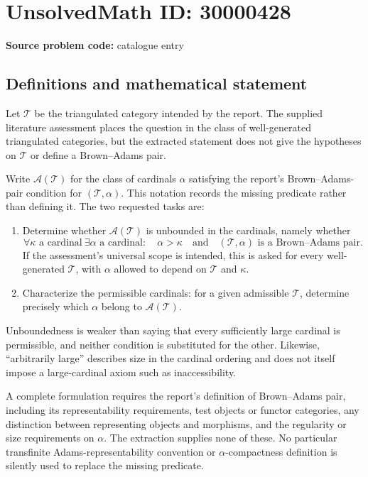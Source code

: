 \documentclass[11pt]{article}
\begin{document}
\section*{UnsolvedMath ID: 30000428}
\textbf{Source problem code:} catalogue entry
\subsection{Definitions and mathematical statement}
Let $\mathcal T$ be the triangulated category intended by the report. The supplied literature assessment places the question in the class of well-generated triangulated categories, but the extracted statement does not give the hypotheses on $\mathcal T$ or define a Brown--Adams pair.

Write $\mathcal A(\mathcal T)$ for the class of cardinals $\alpha$ satisfying the report's Brown--Adams-pair condition for $(\mathcal T,\alpha)$. This notation records the missing predicate rather than defining it. The two requested tasks are:
\begin{enumerate}
\item Determine whether $\mathcal A(\mathcal T)$ is unbounded in the cardinals, namely whether
\[
 \forall\kappa\text{ a cardinal}\ \exists\alpha\text{ a cardinal}:
 \quad\alpha>\kappa\quad\text{and}\quad
 (\mathcal T,\alpha)\text{ is a Brown--Adams pair}.
\]
If the assessment's universal scope is intended, this is asked for every well-generated $\mathcal T$, with $\alpha$ allowed to depend on $\mathcal T$ and $\kappa$.
\item Characterize the permissible cardinals: for a given admissible $\mathcal T$, determine precisely which $\alpha$ belong to $\mathcal A(\mathcal T)$.
\end{enumerate}

Unboundedness is weaker than saying that every sufficiently large cardinal is permissible, and neither condition is substituted for the other. Likewise, ``arbitrarily large'' describes size in the cardinal ordering and does not itself impose a large-cardinal axiom such as inaccessibility.

A complete formulation requires the report's definition of Brown--Adams pair, including its representability requirements, test objects or functor categories, any distinction between representing objects and morphisms, and the regularity or size requirements on $\alpha$. The extraction supplies none of these. No particular transfinite Adams-representability convention or $\alpha$-compactness definition is silently used to replace the missing predicate.
\end{document}
